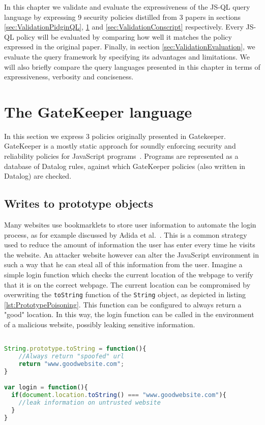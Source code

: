 In this chapter we validate and evaluate the expressiveness of the JS-QL query language by expressing 9 security policies distilled from 3 papers in sections \ref{sec:ValidationPidginQL}, \ref{sec:ValidationGK} and \ref{sec:ValidationConscript} respectively. Every JS-QL policy will be evaluated by comparing how well it matches the policy expressed in the original paper. Finally, in section \ref{sec:ValidationEvaluation}, we evaluate the query framework by specifying its advantages and limitations. We will also briefly compare the query languages presented in this chapter in terms of expressiveness, verbosity and conciseness.
\section{The GateKeeper language}
\label{sec:ValidationGK}

In this section we express 3 policies originally presented in Gatekeeper. GateKeeper is a mostly static approach for soundly enforcing security and reliability policies for JavaScript programs~\cite{GateKeeper}. Programs are represented as a database of Datalog rules, against which GateKeeper policies (also written in Datalog) are checked.

\subsection{Writes to prototype objects}

Many websites use bookmarklets to store user information to automate the login process, as for example discussed by Adida et al.~\cite{PrototypePoisoning}. This is a common strategy used to reduce the amount of information the user has enter every time he visits the website. An attacker website however can alter the JavaScript environment in such a way that he can steal all of this information from the user. Imagine a simple login function which checks the current location of the webpage to verify that it is on the correct webpage. The current location can be compromised by overwriting the \texttt{toString} function of the \texttt{String} object, as depicted in listing \ref{lst:PrototypePoisoning}. This function can be configured to always return a "good" location. In this way, the login function can be called in the environment of a malicious website, possibly leaking sensitive information.

\begin{lstlisting}[label={lst:PrototypePoisoning},language=JavaScript,caption=Prototype poisoning example,mathescape=true]  % float=t?

String.prototype.toString = function(){
    //Always return "spoofed" url
    return "www.goodwebsite.com";
}

var login = function(){
  if(document.location.toString() === "www.goodwebsite.com"){
    //leak information on untrusted website
  }
}
\end{lstlisting}

